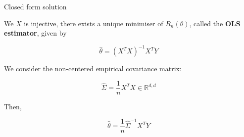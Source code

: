 \documentclass[
10pt, %
a4paper, %
oneside, %
headinclude,footinclude, %
BCOR5mm, %
]{scrartcl}
\begin{document}
\begin{proposition}{Closed form solution}
    
    We $X$ is injective, there exists a unique minimiser of $R_n(\theta)$, called the \textbf{{OLS estimator}}, given by

    \begin{equation}
	\label{def:ols}
	\hat{ \theta}= (X^TX)^{-1}X^TY
    \end{equation}
\end{proposition}

\begin{remark}

    We consider the non-centered empirical covariance matrix:

    \begin{equation}
	\hat{\Sigma} = \frac{1}{n} X^TX\in \mathbb{R}^{d, d}
    \end{equation}

    Then,

    \begin{equation}
	\hat{\theta} = \frac{1}{n} \hat{\Sigma}^{-1} X^TY
    \end{equation}
    
\end{remark}
\end{document}
